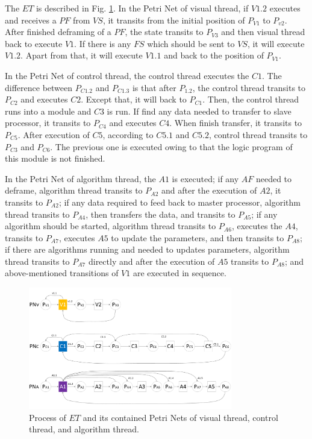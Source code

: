 \documentclass[journal,UTF8]{IEEEtran}
\begin{document}
The $ET$ is described in Fig. \ref{fig:threadExecution}. In the Petri Net of visual thread, if $V1.2$ executes and receives a $PF$ from $VS$, it transits from the initial position of $P_{V1}$ to $P_{v2}$. After finished deframing of a $PF$, the state transits to $P_{V3}$ and then visual thread back to execute $V1$. If there is any $FS$ which should be sent to $VS$, it will execute $V1.2$. Apart from that, it will execute $V1.1$ and back to the position of $P_{V1}$.

In the Petri Net of control thread, the control thread executes the $C1$. The difference between $P_{C1.2}$ and $P_{C1.3}$ is that after $P_{1.2}$, the control thread transits to $P_{C2}$ and executes $C2$. Except that, it will back to $P_{C1}$. Then, the control thread runs into a module and $C3$ is run. If find any data needed to transfer to slave processor, it transits to $P_{C4}$ and executes $C4$. When finish transfer, it transits to $P_{C5}$. After execution of $C5$, according to $C5.1$ and $C5.2$, control thread transits to $P_{C3}$ and $P_{C6}$. The previous one is executed owing to that the logic program of this module is not finished.

In the Petri Net of algorithm thread, the $A1$ is executed; if any $AF$ needed to deframe, algorithm thread transits to $P_{A2}$ and after the execution of $A2$, it transits to $P_{A2}$; if any data required to feed back to master processor, algorithm thread transits to $P_{A4}$, then transfers the data, and transits to $P_{A5}$; if any algorithm should be started, algorithm thread transits to $P_{A6}$, executes the $A4$, transits to $P_{A7}$, executes $A5$ to update the parameters, and then transits to $P_{A8}$; if there are algorithms running and needed to updates parameters, algorithm thread transits to $P_{A7}$ directly and after the execution of $A5$ transits to $P_{A8}$; and above-mentioned transitions of $V1$ are executed in sequence.               

\begin{figure}
	\centering
	\includegraphics[width=3.5in]{fig/ThreadExecution.pdf}
	\caption{ Process of $ET$ and its contained Petri Nets of visual thread, control thread, and algorithm thread.}
	\label{fig:threadExecution}
\end{figure}
\end{document}

